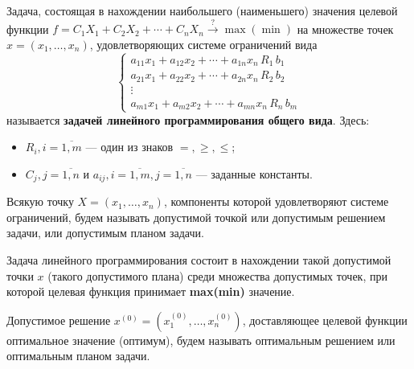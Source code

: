 \documentclass[17pt]{extarticle}
\begin{document}
\begin{definition}
    Задача, состоящая в нахождении наибольшего (наименьшего) значения целевой функции
    \(
    f = C_1 X_1 + C_2 X_2 + \cdots + C_n X_n \xrightarrow{?} \max(\min)
    \)
    на множестве точек \( x = (x_1, \ldots, x_n) \), удовлетворяющих системе ограничений вида
    \[
        \begin{cases}
            a_{11}x_1 + a_{12}x_2 + \cdots + a_{1n}x_n \, R_1 \, b_1 \\
            a_{21}x_1 + a_{22}x_2 + \cdots + a_{2n}x_n \, R_2 \, b_2 \\
            \vdots                                                   \\
            a_{m1}x_1 + a_{m2}x_2 + \cdots + a_{mn}x_n \, R_n \, b_m
        \end{cases}
    \]
    называется \textbf{задачей линейного программирования общего вида}.
    Здесь:
    \begin{itemize}
        \item \( R_i, i = \overline{1, m} \) — один из знаков \( =, \geq, \leq \);
        \item \( C_j, j = \overline{1, n} \) и \( a_{ij}, i = \overline{1, m}, j = \overline{1, n} \) — заданные константы.
    \end{itemize}
\end{definition}

\begin{definition}
    Всякую точку \( X = (x_1, \ldots, x_n) \), компоненты которой удовлетворяют системе ограничений,
    будем называть допустимой точкой или допустимым решением задачи, или допустимым планом задачи.
\end{definition}

Задача линейного программирования состоит в нахождении такой допустимой точки \( x \) (такого допустимого плана) среди множества допустимых точек,
при которой целевая функция принимает \textbf{max(min)} значение.

\begin{definition}
    Допустимое решение \( x^{(0)} = (x_1^{(0)}, \ldots, x_n^{(0)}) \),
    доставляющее целевой функции оптимальное значение (оптимум),
    будем называть оптимальным решением или оптимальным планом задачи.
\end{definition}
\end{document}
